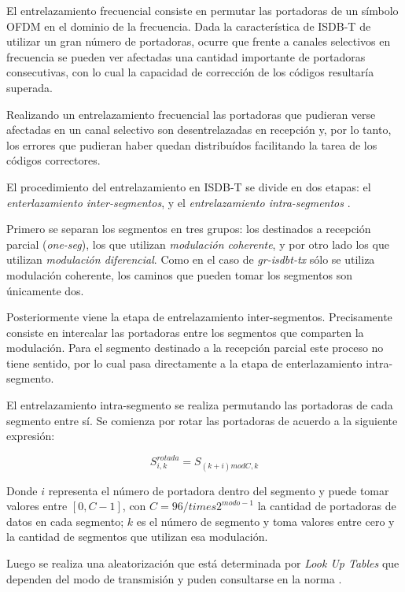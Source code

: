 El entrelazamiento frecuencial consiste en permutar las portadoras de un s\'imbolo OFDM en el dominio de la frecuencia. Dada la caracter\'istica de ISDB-T de utilizar un gran n\'umero de portadoras, ocurre que frente a canales selectivos en frecuencia se pueden ver afectadas una cantidad importante de portadoras consecutivas, con lo cual la capacidad de correcci\'on de los c\'odigos resultar\'ia superada.

Realizando un entrelazamiento frecuencial las portadoras que pudieran verse afectadas en un canal selectivo son desentrelazadas en recepci\'on y, por lo tanto, los errores que pudieran haber quedan distribu\'idos facilitando la tarea de los c\'odigos correctores.

El procedimiento del entrelazamiento en ISDB-T se divide en dos etapas: el \textit{enterlazamiento inter-segmentos}, y el \textit{entrelazamiento intra-segmentos }.

Primero se separan los segmentos en tres grupos: los destinados a recepci\'on parcial (\textit{one-seg}), los que utilizan \textit{modulación coherente}, y por otro lado los que utilizan \textit{modulación diferencial}. Como en el caso de \textit{gr-isdbt-tx} s\'olo se utiliza modulación coherente, los caminos que pueden tomar los segmentos son \'unicamente dos.

Posteriormente viene la etapa de entrelazamiento inter-segmentos. Precisamente consiste en intercalar las portadoras entre los segmentos que comparten la modulación. Para el segmento destinado a la recepci\'on parcial este proceso no tiene sentido, por lo cual pasa directamente a la etapa de enterlazamiento intra-segmento.

El entrelazamiento intra-segmento se realiza permutando las portadoras de cada segmento entre s\'i. Se comienza por rotar las portadoras de acuerdo a la siguiente expresi\'on:

\begin{equation}
S^{rotada}_{i,k} = S_{(k+i) mod C, k}
\end{equation}

Donde $i$ representa el número de portadora dentro del segmento y puede tomar valores entre $[0, C-1]$, con $C = 96 /times 2^{modo-1}$ la cantidad de portadoras de datos en cada segmento; $k$ es el número de segmento y toma valores entre cero y la cantidad de segmentos que utilizan esa modulación. 

Luego se realiza una aleatorización que est\'a determinada por \textit{Look Up Tables} que dependen del modo de transmisi\'on y puden consultarse en la norma \cite{norma}.

